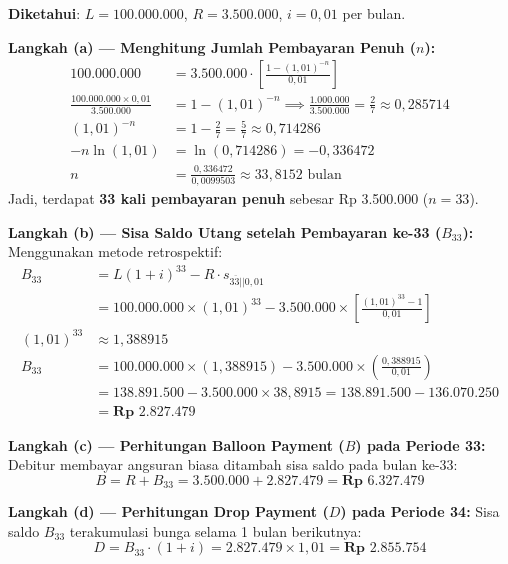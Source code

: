 \documentclass[11pt,a4paper]{article}
\newcommand{\angl}[1]{\overline{#1|}}
\begin{document}
\begin{solusibox}
\textbf{Diketahui}: $L = 100.000.000$, $R = 3.500.000$, $i = 0{,}01$ per bulan.

\textbf{Langkah (a) --- Menghitung Jumlah Pembayaran Penuh ($n$):}
\begin{align*}
    100.000.000 &= 3.500.000 \cdot \left[ \frac{1 - (1{,}01)^{-n}}{0{,}01} \right] \\
    \frac{100.000.000 \times 0{,}01}{3.500.000} &= 1 - (1{,}01)^{-n} \implies \frac{1.000.000}{3.500.000} = \frac{2}{7} \approx 0{,}285714 \\
    (1{,}01)^{-n} &= 1 - \frac{2}{7} = \frac{5}{7} \approx 0{,}714286 \\
    -n \ln(1{,}01) &= \ln(0{,}714286) = -0{,}336472 \\
    n &= \frac{0{,}336472}{0{,}0099503} \approx 33{,}8152 \text{ bulan}
\end{align*}
Jadi, terdapat \textbf{33 kali pembayaran penuh} sebesar Rp 3.500.000 ($n = 33$).

\textbf{Langkah (b) --- Sisa Saldo Utang setelah Pembayaran ke-33 ($B_{33}$):}
Menggunakan metode retrospektif:
\begin{align*}
    B_{33} &= L(1+i)^{33} - R \cdot s_{\angl{33}|0{,}01} \\
    &= 100.000.000 \times (1{,}01)^{33} - 3.500.000 \times \left[ \frac{(1{,}01)^{33} - 1}{0{,}01} \right] \\
    (1{,}01)^{33} &\approx 1{,}388915 \\
    B_{33} &= 100.000.000 \times (1{,}388915) - 3.500.000 \times \left(\frac{0{,}388915}{0{,}01}\right) \\
    &= 138.891.500 - 3.500.000 \times 38{,}8915 = 138.891.500 - 136.070.250 \\
    &= \mathbf{\text{Rp } 2.827.479}
\end{align*}

\textbf{Langkah (c) --- Perhitungan Balloon Payment ($B$) pada Periode 33:}
Debitur membayar angsuran biasa ditambah sisa saldo pada bulan ke-33:
$$B = R + B_{33} = 3.500.000 + 2.827.479 = \mathbf{\text{Rp } 6.327.479}$$

\textbf{Langkah (d) --- Perhitungan Drop Payment ($D$) pada Periode 34:}
Sisa saldo $B_{33}$ terakumulasi bunga selama 1 bulan berikutnya:
$$D = B_{33} \cdot (1 + i) = 2.827.479 \times 1{,}01 = \mathbf{\text{Rp } 2.855.754}$$
\end{solusibox}

\newpage
\end{document}
